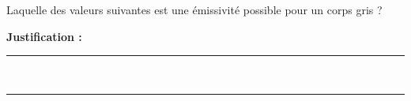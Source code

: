 Laquelle des valeurs suivantes est une émissivité possible pour un corps gris ?

\choices

\noindent\textbf{Justification :} \hrulefill \\[2.5ex]
\rule{\linewidth}{0.4pt} \\[2.5ex]
\rule{\linewidth}{0.4pt}
\vfill
